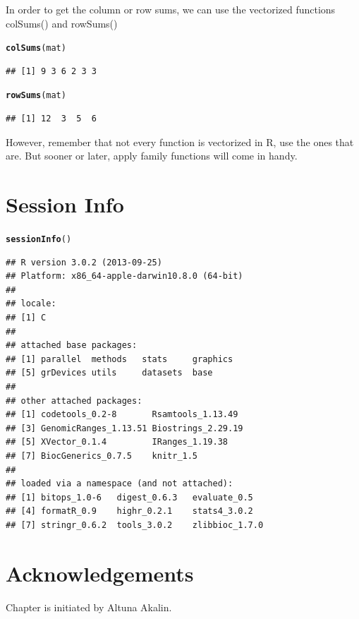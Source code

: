 \documentclass[english,nohyper]{tufte-book}\usepackage[]{graphicx}\usepackage[]{color}
\makeatletter
\newcommand{\hlstd}[1]{\textcolor[rgb]{0.345,0.345,0.345}{#1}}%
\newcommand{\hlkwd}[1]{\textcolor[rgb]{0.737,0.353,0.396}{\textbf{#1}}}%
\newenvironment{kframe}{%
 \def\at@end@of@kframe{}%
 \ifinner\ifhmode%
  \def\at@end@of@kframe{\end{minipage}}%
  \begin{minipage}{\columnwidth}%
 \fi\fi%
 \def\FrameCommand##1{\hskip\@totalleftmargin \hskip-\fboxsep
 \colorbox{shadecolor}{##1}\hskip-\fboxsep
     \hskip-\linewidth \hskip-\@totalleftmargin \hskip\columnwidth}%
 \MakeFramed {\advance\hsize-\width
   \@totalleftmargin\z@ \linewidth\hsize
   \@setminipage}}%
 {\par\unskip\endMakeFramed%
 \at@end@of@kframe}
\newenvironment{knitrout}{}{} %
\makeatother
\begin{document}
In order to get the column or row sums, we can use the vectorized
functions colSums() and rowSums()

\begin{knitrout}
\color{fgcolor}\begin{kframe}
\begin{alltt}
\hlkwd{colSums}\hlstd{(mat)}
\end{alltt}
\begin{verbatim}
## [1] 9 3 6 2 3 3
\end{verbatim}
\begin{alltt}
\hlkwd{rowSums}\hlstd{(mat)}
\end{alltt}
\begin{verbatim}
## [1] 12  3  5  6
\end{verbatim}
\end{kframe}
\end{knitrout}


However, remember that not every function is vectorized in R, use
the ones that are. But sooner or later, apply family functions will
come in handy.


\section{Session Info}

\begin{knitrout}
\color{fgcolor}\begin{kframe}
\begin{alltt}
\hlkwd{sessionInfo}\hlstd{()}
\end{alltt}
\begin{verbatim}
## R version 3.0.2 (2013-09-25)
## Platform: x86_64-apple-darwin10.8.0 (64-bit)
## 
## locale:
## [1] C
## 
## attached base packages:
## [1] parallel  methods   stats     graphics 
## [5] grDevices utils     datasets  base     
## 
## other attached packages:
## [1] codetools_0.2-8       Rsamtools_1.13.49    
## [3] GenomicRanges_1.13.51 Biostrings_2.29.19   
## [5] XVector_0.1.4         IRanges_1.19.38      
## [7] BiocGenerics_0.7.5    knitr_1.5            
## 
## loaded via a namespace (and not attached):
## [1] bitops_1.0-6   digest_0.6.3   evaluate_0.5  
## [4] formatR_0.9    highr_0.2.1    stats4_3.0.2  
## [7] stringr_0.6.2  tools_3.0.2    zlibbioc_1.7.0
\end{verbatim}
\end{kframe}
\end{knitrout}



\section{Acknowledgements}

Chapter is initiated by Altuna Akalin.
\end{document}
